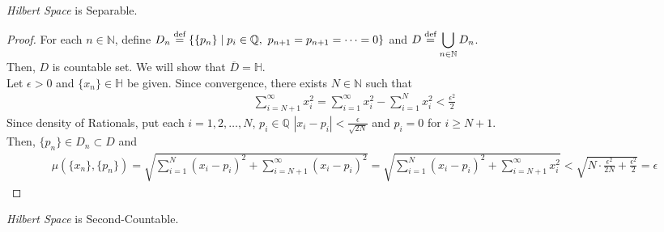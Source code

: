 \documentclass[11pt]{article}
\theoremstyle{romanstyle}
\newcommand{\dis}{\displaystyle}
\newcommand{\defequal}{\overset{\textnormal{def}}{=}}
\begin{document}
\begin{theorem}
    \textit{Hilbert Space} is Separable.
\end{theorem}
\begin{proof}
    For each $n \in \mathbb{N}$, define $D_n \defequal \{\{p_n\} \mid p_i \in \mathbb{Q},\ p_{n+1} = p_{n+1} = \cdots = 0 \}$ and $\dis D \defequal \bigcup_{n \in \mathbb{N}} D_n$. \\
    Then, $D$ is countable set. We will show that $\overline{D} = \mathbb{H}$. \\
    Let $\epsilon > 0$ and $\{x_n\} \in \mathbb{H}$ be given. Since convergence, there exists $N \in \mathbb{N}$ such that 
    \begin{align*}
        \sum_{i=N+1}^{\infty} x^2_i = \sum_{i=1}^{\infty} x^2_i - \sum_{i=1}^{N} x^2_i < \frac{\epsilon^2}{2}
    \end{align*}
    Since density of Rationals, put each $i = 1, 2 , \ldots, N$, $p_i \in \mathbb{Q}$ $\dis |x_i - p_i| < \frac{\epsilon}{\sqrt{2N}}$ and $p_i = 0$ for $i \geq N+1$. \\
    Then, $\{p_n\} \in D_n \subset D$ and
    \begin{align*}
        \mu\left( \{x_n\}, \{p_n\} \right)
        = \sqrt{\sum_{i=1}^{N} (x_i - p_i)^2 + \sum_{i=N+1}^{\infty} (x_i - p_i)^2}
        = \sqrt{\sum_{i=1}^{N} (x_i - p_i)^2 + \sum_{i=N+1}^{\infty} x_i^2}
        < \sqrt{N \cdot \frac{\epsilon^2}{2N} + \frac{\epsilon^2}{2}}
        = \epsilon 
    \end{align*}
\end{proof}
\begin{corollary}
    \textit{Hilbert Space} is Second-Countable.
\end{corollary}
\end{document}
